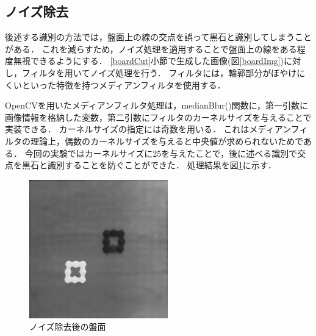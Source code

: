 \documentclass[openright]{nitocs}
\numberwithin{equation}{section}
\begin{document}
        \subsection{ノイズ除去}
        \label{noiseReduce}
            後述する識別の方法では，盤面上の線の交点を誤って黒石と識別してしまうことがある．
            これを減らすため，ノイズ処理を適用することで盤面上の線をある程度無視できるようにする． 
            \ref{boardCut}小節で生成した画像(図\ref{boardImg})に対し，フィルタを用いてノイズ処理を行う．
            フィルタには，輪郭部分がぼやけにくいといった特徴を持つメディアンフィルタを使用する．
            
            OpenCVを用いたメディアンフィルタ処理は，medianBlur()関数に，第一引数に画像情報を格納した変数，第二引数にフィルタのカーネルサイズを与えることで実装できる．
            カーネルサイズの指定には奇数を用いる．
            これはメディアンフィルタの理論上，偶数のカーネルサイズを与えると中央値が求められないためである．
            今回の実験ではカーネルサイズに25を与えたことで，後に述べる識別で交点を黒石と識別することを防ぐことができた．
            処理結果を図\ref{noiseReducedImg}に示す．
            \begin{figure}[tb] %
                \begin{center}
                \includegraphics[clip,width=60mm]{noiseReducedImg.jpg} 
                \caption{ノイズ除去後の盤面}
                \label{noiseReducedImg}
                \end{center}
            \end{figure}
\end{document}
